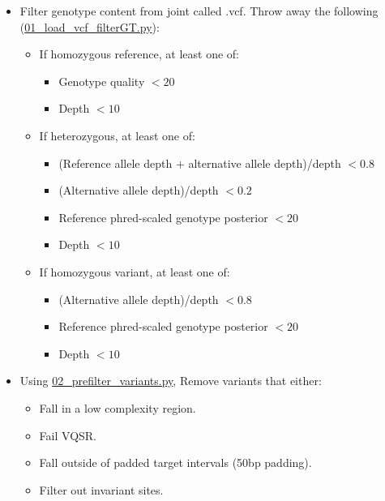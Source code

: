 \documentclass[12pt]{article}
\begin{document}
\graphicspath{{../../../QC_plots/sample_plots/}{../../../QC_plots/variant_plots/}}
\maketitle
\begin{itemize}
	\item Filter genotype content from joint called .vcf. Throw away the following (\href{https://github.com/astheeggeggs/BipEx/blob/master/scripts_BipEx/QC_BipEx/01_load_vcf_filterGT.py}{01\_load\_vcf\_filterGT.py}):
	\begin{itemize}
		\item If homozygous reference, at least one of:
		\begin{itemize}
			\item Genotype quality $< 20$
			\item Depth $< 10$
		\end{itemize}
		\item If heterozygous, at least one of:
		\begin{itemize}
			\item (Reference allele depth + alternative allele depth)/depth $< 0.8$
			\item (Alternative allele depth)/depth $< 0.2$
			\item Reference phred-scaled genotype posterior $< 20$
			\item Depth $< 10$
		\end{itemize}
		\item If homozygous variant, at least one of:
		\begin{itemize}
			\item (Alternative allele depth)/depth $< 0.8$
			\item Reference phred-scaled genotype posterior $< 20$
			\item Depth $< 10$
		\end{itemize}
    \end{itemize}
    \item Using \href{https://github.com/astheeggeggs/BipEx/blob/master/scripts_BipEx/QC_BipEx/02_prefilter_variants.py}{02\_prefilter\_variants.py}, Remove variants that either:
    \begin{itemize}
    	\item Fall in a low complexity region.
    	\item Fail VQSR.
    	\item Fall outside of padded target intervals (50bp padding).
    	\item Filter out invariant sites.

\end{itemize}
\end{itemize}
\end{document}
